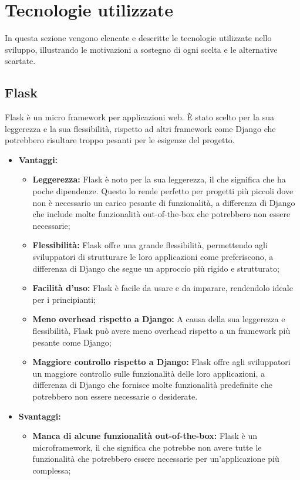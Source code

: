\documentclass[10pt, a4paper]{article}
\begin{document}
\newpage
\section{Tecnologie utilizzate}
In questa sezione vengono elencate e descritte le tecnologie utilizzate nello sviluppo, illustrando le motivazioni a sostegno di ogni scelta e le alternative scartate.

\subsection{Flask}
Flask è un micro framework per applicazioni web. È stato scelto per la sua leggerezza e la sua flessibilità, rispetto ad altri framework come Django che potrebbero risultare troppo pesanti per le esigenze del progetto.

\begin{itemize}
\item \textbf{Vantaggi:}
\begin{itemize}
\item \textbf{Leggerezza:} Flask è noto per la sua leggerezza, il che significa che ha poche dipendenze. Questo lo rende perfetto per progetti più piccoli dove non è necessario un carico pesante di funzionalità, a differenza di Django che include molte funzionalità out-of-the-box che potrebbero non essere necessarie;
\item \textbf{Flessibilità:} Flask offre una grande flessibilità, permettendo agli sviluppatori di strutturare le loro applicazioni come preferiscono, a differenza di Django che segue un approccio più rigido e strutturato;
\item \textbf{Facilità d'uso:} Flask è facile da usare e da imparare, rendendolo ideale per i principianti;
\item \textbf{Meno overhead rispetto a Django:} A causa della sua leggerezza e flessibilità, Flask può avere meno overhead rispetto a un framework più pesante come Django;
\item \textbf{Maggiore controllo rispetto a Django:} Flask offre agli sviluppatori un maggiore controllo sulle funzionalità delle loro applicazioni, a differenza di Django che fornisce molte funzionalità predefinite che potrebbero non essere necessarie o desiderate.
\end{itemize}
\item \textbf{Svantaggi:}
\begin{itemize}
\item \textbf{Manca di alcune funzionalità out-of-the-box:} Flask è un microframework, il che significa che potrebbe non avere tutte le funzionalità che potrebbero essere necessarie per un'applicazione più complessa;

\end{itemize}
\end{itemize}
\end{document}
